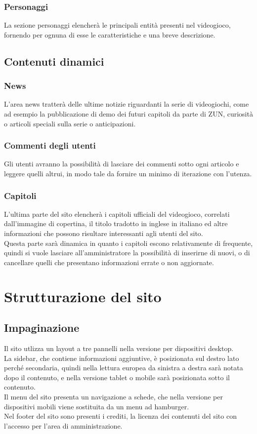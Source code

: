 \documentclass[openany, a4paper, 12pt]{report}
\begin{document}
		\subsubsection{Personaggi}
		La sezione personaggi elencherà le principali entità presenti nel videogioco, fornendo per ognuna di esse le caratteristiche e una breve descrizione.
		
	\subsection{Contenuti dinamici}
		\subsubsection{News}
		L'area news tratterà delle ultime notizie riguardanti la serie di videogiochi, come ad esempio la pubblicazione di demo dei futuri capitoli da parte di ZUN, curiosità o articoli speciali sulla serie o anticipazioni.
		
		\subsubsection{Commenti degli utenti}
		Gli utenti avranno la possibilità di lasciare dei commenti sotto ogni articolo e leggere quelli altrui, in modo tale da fornire un minimo di iterazione con l'utenza.
		
		\subsubsection{Capitoli}
		L'ultima parte del sito elencherà i capitoli ufficiali del videogioco, correlati dall'immagine di copertina, il titolo tradotto in inglese in italiano ed altre informazioni che possono risultare interessanti agli utenti del sito.\\
		Questa parte sarà dinamica in quanto i capitoli escono relativamente di frequente, quindi si vuole lasciare all'amministratore la possibilità di inserirne di nuovi, o di cancellare quelli che presentano informazioni errate o non aggiornate.
	
	\section{Strutturazione del sito}
	\subsection{Impaginazione}
	Il sito utlizza un layout a tre pannelli nella versione per dispositivi desktop.\\
	La sidebar, che contiene informazioni aggiuntive, è posizionata sul destro lato perché secondaria, quindi nella lettura europea da sinistra a destra sarà notata dopo il contenuto, e nella versione tablet o mobile sarà posizionata sotto il contenuto.\\
	Il menu del sito presenta un navigazione a schede, che nella versione per dispositivi mobili viene sostituita da un menu ad hamburger.\\
	Nel footer del sito sono presenti i crediti, la licenza dei contenuti del sito con l'accesso per l'area di amministrazione.
	
\end{document}
